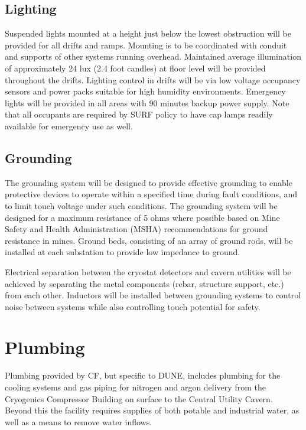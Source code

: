 \subsection{Lighting}
\label{sec:fscf-und-light}

Suspended lights mounted at a height just below the lowest obstruction will be provided for all drifts and ramps. Mounting is to be coordinated with conduit and supports of other systems running overhead. Maintained average illumination of approximately 24 lux (2.4 foot candles) at floor level will be provided throughout the drifts. Lighting control in drifts will be via low voltage occupancy sensors and power packs suitable for high humidity environments.  Emergency lights will be provided in all areas with 90 minutes backup power supply.  Note that all occupants are required by SURF policy to have cap lamps readily available for emergency use as well.


\subsection{Grounding}
\label{sec:fscf-und-grounding}

The grounding system will be designed to provide effective grounding to enable protective devices to operate within a specified time during fault conditions, and to limit touch voltage under such conditions. The grounding system will be designed for a maximum resistance of 5 ohms where possible based on Mine Safety and Health Administration (MSHA) recommendations for ground resistance in mines. Ground beds, consisting of an array of ground rods, will be installed at each substation to provide low impedance to ground.

Electrical separation between the cryostat detectors and cavern utilities will be achieved by separating the metal components (rebar, structure support, etc.) from each other. Inductors will be installed between grounding systems to control noise between systems while also controlling touch potential for safety.

\section{Plumbing}
\label{sec:fscf-und-plumbing}

Plumbing provided by CF, but specific to DUNE, includes plumbing for the cooling systems and gas piping for nitrogen and argon delivery from the Cryogenics Compressor Building on surface to the Central Utility Cavern. Beyond this the facility requires supplies of both potable and industrial water, as well as a means to remove water inflows. 

